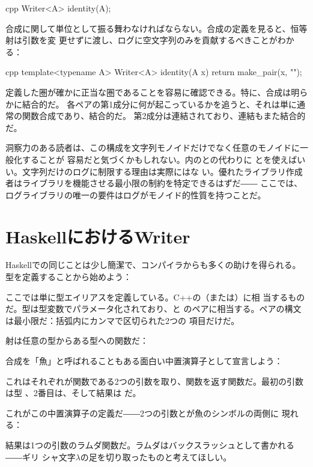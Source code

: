 \begin{snip}{cpp}
Writer<A> identity(A);
\end{snip}
合成に関して単位として振る舞わなければならない。合成の定義を見ると、恒等射は引数を変
更せずに渡し、ログに空文字列のみを貢献するべきことがわかる：

\begin{snip}{cpp}
template<typename A>
Writer<A> identity(A x) {
    return make_pair(x, "");
}
\end{snip}
定義した圏が確かに正当な圏であることを容易に確認できる。特に、合成は明らかに結合的だ。
各ペアの第1成分に何が起こっているかを追うと、それは単に通常の関数合成であり、結合的だ。
第2成分は連結されており、連結もまた結合的だ。

洞察力のある読者は、この構成を文字列モノイドだけでなく任意のモノイドに一般化することが
容易だと気づくかもしれない。内の\code{+}との代わりに
とを使えばいい。文字列だけのログに制限する理由は実際にはな
い。優れたライブラリ作成者はライブラリを機能させる最小限の制約を特定できるはずだ――
ここでは、ログライブラリの唯一の要件はログがモノイド的性質を持つことだ。

\section{HaskellにおけるWriter}

Haskellでの同じことは少し簡潔で、コンパイラからも多くの助けを得られる。
型を定義することから始めよう：

ここでは単に型エイリアスを定義している。C++の（または）に相
当するものだ。型は型変数でパラメータ化されており、と
のペアに相当する。ペアの構文は最小限だ：括弧内にカンマで区切られた2つの
項目だけだ。

射は任意の型からある型への関数だ：

合成を「魚」と呼ばれることもある面白い中置演算子として宣言しよう：

これはそれぞれが関数である2つの引数を取り、関数を返す関数だ。最初の引数は型
、2番目は、そして結果は
だ。

これがこの中置演算子の定義だ――2つの引数とが魚のシンボルの両側に
現れる：

結果は1つの引数のラムダ関数だ。ラムダはバックスラッシュとして書かれる――ギリ
シャ文字$\lambda$の足を切り取ったものと考えてほしい。

